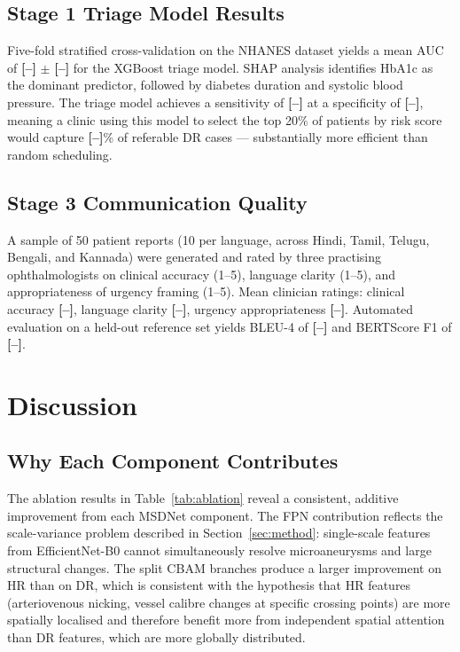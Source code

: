 \documentclass[review,12pt]{elsarticle}
\newcommand{\RESULT}[1]{\textbf{[--]}}
\begin{document}
\subsection{Stage 1 Triage Model Results}

Five-fold stratified cross-validation on the NHANES dataset yields a mean
AUC of \RESULT{triage_auc} $\pm$ \RESULT{triage_std} for the XGBoost triage
model. SHAP analysis identifies HbA1c as the dominant predictor, followed by
diabetes duration and systolic blood pressure. The triage model achieves a
sensitivity of \RESULT{triage_sens} at a specificity of \RESULT{triage_spec},
meaning a clinic using this model to select the top 20\% of patients by
risk score would capture \RESULT{triage_capture}\% of referable DR cases —
substantially more efficient than random scheduling.

\subsection{Stage 3 Communication Quality}

A sample of 50 patient reports (10 per language, across Hindi, Tamil, Telugu,
Bengali, and Kannada) were generated and rated by three practising
ophthalmologists on clinical accuracy (1--5), language clarity (1--5), and
appropriateness of urgency framing (1--5). Mean clinician ratings:
clinical accuracy \RESULT{comms_accuracy}, language clarity \RESULT{comms_clarity},
urgency appropriateness \RESULT{comms_urgency}. Automated evaluation on a
held-out reference set yields BLEU-4 of \RESULT{comms_bleu} and BERTScore
F1 of \RESULT{comms_bertscore}.

\section{Discussion}
\label{sec:discussion}

\subsection{Why Each Component Contributes}

The ablation results in Table~\ref{tab:ablation} reveal a consistent, additive
improvement from each MSDNet component. The FPN contribution reflects the
scale-variance problem described in Section~\ref{sec:method}: single-scale
features from EfficientNet-B0 cannot simultaneously resolve microaneurysms
and large structural changes. The split CBAM branches produce a larger
improvement on HR than on DR, which is consistent with the hypothesis that HR
features (arteriovenous nicking, vessel calibre changes at specific crossing
points) are more spatially localised and therefore benefit more from independent
spatial attention than DR features, which are more globally distributed.
\end{document}
